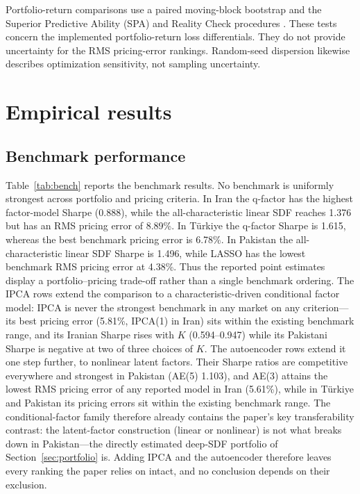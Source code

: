 \documentclass[12pt]{article}
\begin{document}
Portfolio-return comparisons use a paired moving-block bootstrap and the Superior Predictive Ability (SPA) and Reality Check procedures \citep{hansen2005,white2000}. These tests concern the implemented portfolio-return loss differentials. They do not provide uncertainty for the RMS pricing-error rankings. Random-seed dispersion likewise describes optimization sensitivity, not sampling uncertainty.

\section{Empirical results}\label{sec:results}

\subsection{Benchmark performance}\label{sec:bench}

Table~\ref{tab:bench} reports the benchmark results. No benchmark is uniformly strongest across portfolio and pricing criteria. In Iran the q-factor has the highest factor-model Sharpe (0.888), while the all-characteristic linear SDF reaches 1.376 but has an RMS pricing error of 8.89\%. In T\"urkiye the q-factor Sharpe is 1.615, whereas the best benchmark pricing error is 6.78\%. In Pakistan the all-characteristic linear SDF Sharpe is 1.496, while LASSO has the lowest benchmark RMS pricing error at 4.38\%. Thus the reported point estimates display a portfolio--pricing trade-off rather than a single benchmark ordering. The IPCA rows extend the comparison to a characteristic-driven conditional factor model: IPCA is never the strongest benchmark in any market on any criterion---its best pricing error (5.81\%, IPCA(1) in Iran) sits within the existing benchmark range, and its Iranian Sharpe rises with $K$ (0.594--0.947) while its Pakistani Sharpe is negative at two of three choices of $K$. The autoencoder rows extend it one step further, to nonlinear latent factors. Their Sharpe ratios are competitive everywhere and strongest in Pakistan (AE(5) 1.103), and AE(3) attains the lowest RMS pricing error of any reported model in Iran (5.61\%), while in T\"urkiye and Pakistan its pricing errors sit within the existing benchmark range. The conditional-factor family therefore already contains the paper's key transferability contrast: the latent-factor construction (linear or nonlinear) is not what breaks down in Pakistan---the directly estimated deep-SDF portfolio of Section~\ref{sec:portfolio} is. Adding IPCA and the autoencoder therefore leaves every ranking the paper relies on intact, and no conclusion depends on their exclusion.
\end{document}
